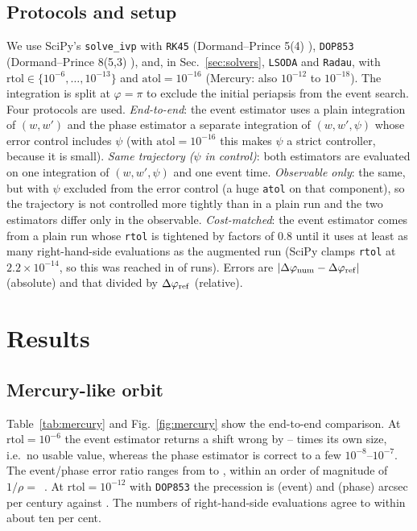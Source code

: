 \documentclass[11pt,a4paper]{article}
\newcommand{\dphi}{\Delta\varphi}
\begin{document}
\subsection{Protocols and setup}
\label{sec:setup}
We use SciPy's \texttt{solve\_ivp} \citep{Virtanen2020} with \texttt{RK45} (Dormand--Prince 5(4) \citep{Dormand1980}), \texttt{DOP853} (Dormand--Prince 8(5,3) \citep{Hairer1993}), and, in Sec.~\ref{sec:solvers}, \texttt{LSODA} and \texttt{Radau}, with $\mathrm{rtol}\in\{10^{-6},\dots,10^{-13}\}$ and $\mathrm{atol}=10^{-16}$ (Mercury: also $10^{-12}$ to $10^{-18}$). The integration is split at $\varphi=\pi$ to exclude the initial periapsis from the event search. Four protocols are used. \emph{End-to-end}: the event estimator uses a plain integration of $(w,w')$ and the phase estimator a separate integration of $(w,w',\psi)$ whose error control includes $\psi$ (with $\mathrm{atol}=10^{-16}$ this makes $\psi$ a strict controller, because it is small). \emph{Same trajectory ($\psi$ in control)}: both estimators are evaluated on one integration of $(w,w',\psi)$ and one event time. \emph{Observable only}: the same, but with $\psi$ excluded from the error control (a huge \texttt{atol} on that component), so the trajectory is not controlled more tightly than in a plain run and the two estimators differ only in the observable. \emph{Cost-matched}: the event estimator comes from a plain run whose \texttt{rtol} is tightened by factors of $0.8$ until it uses at least as many right-hand-side evaluations as the augmented run (SciPy clamps \texttt{rtol} at $2.2\times10^{-14}$, so this was reached in \ScCostReached{} of \ScN{} runs). Errors are $|\dphi_{\rm num}-\dphi_{\rm ref}|$ (absolute) and that divided by $\dphi_{\rm ref}$ (relative).

\section{Results}

\subsection{Mercury-like orbit}
Table~\ref{tab:mercury} and Fig.~\ref{fig:mercury} show the end-to-end comparison. At $\mathrm{rtol}=10^{-6}$ the event estimator returns a shift wrong by \MercEventSixMin--\MercEventSixMax{} times its own size, i.e.\ no usable value, whereas the phase estimator is correct to a few $10^{-8}$--$10^{-7}$. The event/phase error ratio ranges from \MercRatioMin{} to \MercRatioMax{}, within an order of magnitude of $1/\rho=$~\MercRhoInv. At $\mathrm{rtol}=10^{-12}$ with \texttt{DOP853} the precession is \MercArcsecEvent{} (event) and \MercArcsecPhase{} (phase) arcsec per century against \MercArcsecRef{}. The numbers of right-hand-side evaluations agree to within about ten per cent.
\end{document}
